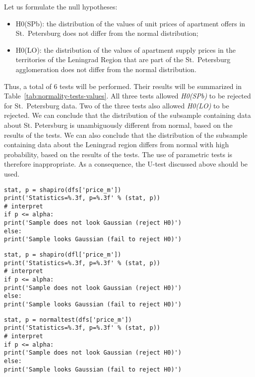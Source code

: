 \documentclass[]{scrreprt}
\begin{document}
Let us formulate the null hypotheses:
\begin{itemize}
	\item H0(SPb): the distribution of the values of unit prices of apartment offers in St.~Petersburg does not differ from the normal distribution;
	\item H0(LO): the distribution of the values of apartment supply prices in the territories of the Leningrad Region that are part of the St.~Petersburg agglomeration does not differ from the normal distribution.
\end{itemize} 
Thus, a total of 6 tests will be performed. Their results will be summarized in Table~\ref{tab:normality-tests-values}. All three tests allowed \emph{H0(SPb)} to be rejected for St.~Petersburg data. Two of the three tests also allowed \emph{H0(LO)} to be rejected. We can conclude that the distribution of the subsample containing data about St. Petersburg is unambiguously different from normal, based on the results of the tests. We can also conclude that the distribution of the subsample containing data about the Leningrad region differs from normal with high probability, based on the results of the tests. The use of parametric tests is therefore inappropriate. As a consequence, the U-test discussed above should be used.
%
\begin{lstlisting}[float, caption = Performing the Shapiro-Wilk test for St.~Petersburg data, firstnumber=1, label= lst:shapiro-wilk-test-spb]
stat, p = shapiro(dfs['price_m'])
print('Statistics=%.3f, p=%.3f' % (stat, p))
# interpret
if p <= alpha:
print('Sample does not look Gaussian (reject H0)')
else:
print('Sample looks Gaussian (fail to reject H0)')
\end{lstlisting}
%
\begin{lstlisting}[float, caption = Performing the Shapiro-Wilk test for Leningrad Region data, firstnumber=1, label= lst:shapiro-wilk-test-lo]
stat, p = shapiro(dfl['price_m'])
print('Statistics=%.3f, p=%.3f' % (stat, p))
# interpret
if p <= alpha:
print('Sample does not look Gaussian (reject H0)')
else:
print('Sample looks Gaussian (fail to reject H0)')
\end{lstlisting}  
%
\begin{lstlisting}[float, caption = Performing the D'Agostino's K-squared test for St.~Petersburg data, firstnumber=1, label= lst:K^2-D'Agostino-test-spb]
stat, p = normaltest(dfs['price_m'])
print('Statistics=%.3f, p=%.3f' % (stat, p))
# interpret
if p <= alpha:
print('Sample does not look Gaussian (reject H0)')
else:
print('Sample looks Gaussian (fail to reject H0)')
\end{lstlisting}
\end{document}
